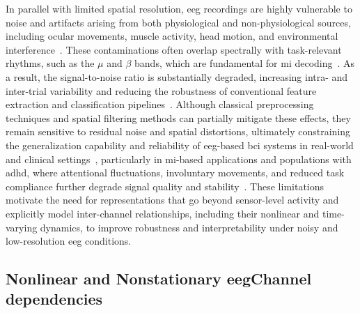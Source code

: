 In parallel with limited spatial resolution, \gls{eeg} recordings are highly vulnerable to noise and artifacts arising from both physiological and non-physiological sources, including ocular movements, muscle activity, head motion, and environmental interference~\cite{de2018agenda}. These contaminations often overlap spectrally with task-relevant rhythms, such as the $\mu$ and $\beta$ bands, which are fundamental for \gls{mi} decoding~\cite{pfurtscheller1999event}. As a result, the signal-to-noise ratio is substantially degraded, increasing intra- and inter-trial variability and reducing the robustness of conventional feature extraction and classification pipelines~\cite{bouazizi2024interpretability}. Although classical preprocessing techniques and spatial filtering methods can partially mitigate these effects, they remain sensitive to residual noise and spatial distortions, ultimately constraining the generalization capability and reliability of \gls{eeg}-based \gls{bci} systems in real-world and clinical settings~\cite{akuthota2023complete,pan2025enhancing}, particularly in \gls{mi}-based applications and populations with \gls{adhd}, where attentional fluctuations, involuntary movements, and reduced task compliance further degrade signal quality and stability~\cite{lenartowicz2018adhd}. These limitations motivate the need for representations that go beyond sensor-level activity and explicitly model inter-channel relationships, including their nonlinear and time-varying dynamics, to improve robustness and interpretability under noisy and low-resolution \gls{eeg} conditions.

\subsection{Nonlinear and Nonstationary \gls{eeg}Channel dependencies}\label{sec:nonlinear}

